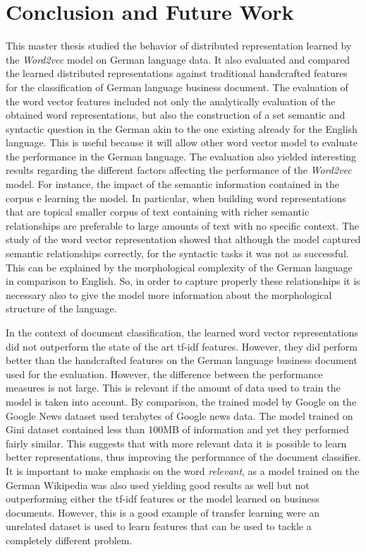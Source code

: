 
\chapter{Conclusion and Future Work}
\label{chap:conclusion_future_work}

This master thesis studied the behavior of distributed representation learned by the \textit{Word2vec} model on German language data. It also evaluated and compared the learned distributed representations  against traditional handcrafted features for the classification of German language business document.
The evaluation of the word vector features included not only the analytically evaluation of the obtained word representations, but also the construction of a set  semantic and syntactic question in the German akin to the  one existing already for the English language. This is useful because it will allow other word vector model to evaluate the performance in the German language. The evaluation also yielded interesting results regarding the different factors affecting the performance of the \textit{Word2vec} model. For instance,  the impact of the semantic information contained in the corpus e learning the model. In particular, when building word representations that are topical smaller corpus of  text containing  with richer semantic relationships  are preferable to large amounts of text with no specific context. 
The study of the word vector representation showed that although the model
captured  semantic relationships correctly, for the syntactic tasks it was  not as successful. This can be explained by the morphological complexity of the German language in comparison to English. So, in order to capture properly these relationships it is necessary also to give the model more information about the morphological structure of the language.

In the context of document classification, the learned word vector
representations did   not outperform the state of the art  \ac{tf-idf}
features. However, they  did perform better than the handcrafted features on
the German language business document used for the evaluation. However, the
difference between  the performance measures is not large. This is relevant
if the amount of data used to train the model is taken into account. By
comparison,  the trained model by Google on the Google News dataset used
terabytes of Google news data. The model trained on Gini dataset contained
less than 100MB of information and yet they performed fairly similar. This
suggests that with more relevant data it is possible to learn better
representations, thus improving the performance of 
the document classifier. It is important to make emphasis on the word
\textit{relevant},  as a model trained on the German Wikipedia was also used
yielding good results as well but not outperforming either the  \ac{tf-idf}
features or the model learned on business documents.   However, this is a
good example of transfer learning were an unrelated dataset is used to learn
features that can be used to tackle a completely  different problem.


